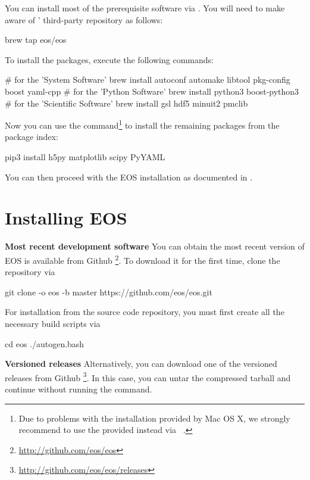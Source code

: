 You can install most of the prerequisite software via .
You will need to make  aware of \EOS'
third-party repository as follows:
\begin{commandline}
brew tap eos/eos
\end{commandline}

To install the packages, execute the following commands:
\begin{commandline}
# for the 'System Software'
brew install autoconf automake libtool pkg-config boost yaml-cpp
# for the 'Python Software'
brew install python3 boost-python3
# for the 'Scientific Software'
brew install gsl hdf5 minuit2 pmclib
\end{commandline}

Now you can use the  command\footnote{%
    Due to problems with the  installation provided by Mac OS
    X, we strongly recommend to use the  provided
     instead via ~.
}
to install the remaining packages from the  package index:
\begin{commandline}
pip3 install h5py matplotlib scipy PyYAML
\end{commandline}


You can then proceed with the EOS installation as documented in .

\section{Installing EOS}
\label{sec:inst:EOS}

\textbf{Most recent development software}\quad
You can obtain the most recent version of EOS is available from Github
\footnote{\url{http://github.com/eos/eos}}. To download it for the first time,
clone the repository via
%
\begin{commandline}
git clone -o eos -b master https://github.com/eos/eos.git
\end{commandline}

For installation from the source code repository, you must first create all the necessary build scripts via
%
\begin{commandline}
cd eos
./autogen.bash
\end{commandline}
%

\textbf{Versioned releases}\quad
Alternatively, you can download one of the versioned releases from Github
\footnote{\url{http://github.com/eos/eos/releases}}. In this case, you can
untar the compressed tarball and continue without running the 
command.\\

